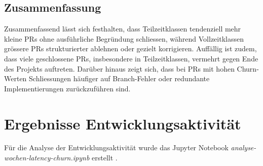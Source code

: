 \subsection{Zusammenfassung}

Zusammenfassend lässt sich festhalten, dass Teilzeitklassen tendenziell mehr kleine PRs ohne ausführliche Begründung schliessen, während Vollzeitklassen grössere PRs strukturierter ablehnen oder gezielt korrigieren. Auffällig ist zudem, dass viele geschlossene PRs, insbesondere in Teilzeitklassen, vermehrt gegen Ende des Projekts auftreten. Darüber hinaus zeigt sich, dass bei PRs mit hohen Churn-Werten Schliessungen häufiger auf Branch-Fehler oder redundante Implementierungen zurückzuführen sind.


\section{Ergebnisse Entwicklungsaktivität}
Für die Analyse der Entwicklungsaktivität wurde das Jupyter Notebook \textit{analyse-wochen-latency-churn.ipynb} erstellt \parencite{stumpf_simon_repo-detectivesba-metric-analysis-scripts_nodate}. 

